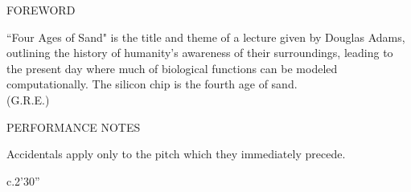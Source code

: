 \documentclass[10pt]{article}
\begin{document}
\vspace*{0.5\baselineskip}

\begin{center}
\huge FOREWORD
\end{center}

\begin{center}
``Four Ages of Sand" is the title and theme of a lecture given by Douglas Adams, outlining the history of humanity's awareness of their surroundings, leading to the present day where much of biological functions can be modeled computationally. The silicon chip is the fourth age of sand.\\
\phantom{text} \hfill (G.R.E.)
  \end{center}
  
\vspace*{3\baselineskip}

\begin{center}
\huge PERFORMANCE NOTES
\end{center}

\begin{center}
Accidentals apply only to the pitch which they immediately precede.
\end{center}

\vspace*{8\baselineskip}

\begin{center}
c.2'30''
\end{center}
\end{document}
